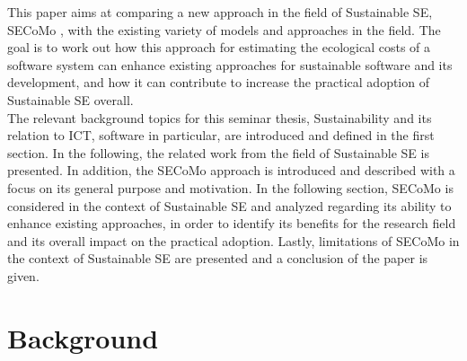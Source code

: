 \documentclass[oribibl]{llncs}
\begin{document}
This paper aims at comparing a new approach in the field of Sustainable SE, SECoMo \cite{schulze_cost_2016}, with the existing variety of models and approaches in the field. The goal is to work out how this approach for estimating the ecological costs of a software system can enhance existing approaches for sustainable software and its development, and how it can contribute to increase the practical adoption of Sustainable SE overall.\\
The relevant background topics for this seminar thesis, Sustainability and its relation to ICT, software in particular, are introduced and defined in the first section. In the following, the related work from the field of Sustainable SE is presented. In addition, the SECoMo approach is introduced and described with a focus on its general purpose and motivation. %
In the following section, SECoMo is considered in the context of Sustainable SE and analyzed regarding its ability to enhance existing approaches, in order to identify its benefits for the research field and its overall impact on the practical adoption. Lastly, limitations of SECoMo in the context of Sustainable SE are presented and a conclusion of the paper is given.

\section{Background}
\end{document}
